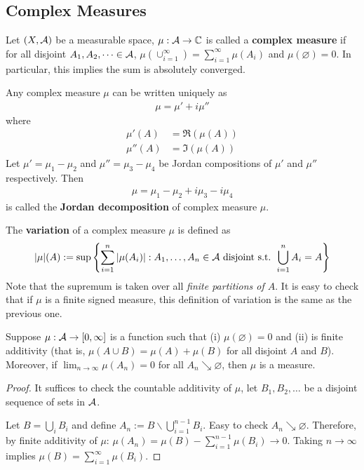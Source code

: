 \documentclass[11pt]{article}
\begin{document}
	\subsection{Complex Measures}
	\begin{definition}
		Let $(X, \mathcal{{A}})$ be a measurable space, $\mu: \mathcal{{A}} \to \mathbb{C}$ is called a \textbf{complex measure} if for all disjoint $A_1, A_2, \dots \in \mathcal{{A}}$, $\mu(\cup_{i=1}^\infty) = \sum_{i=1}^\infty \mu(A_i)$ and $\mu(\varnothing) = 0$.
		In particular, this implies the sum is absolutely converged.
		
		Any complex measure $\mu$ can be written uniquely as
		\begin{align}
			\mu = \mu' + i \mu''
		\end{align}
		where
		\begin{align}
			\mu'(A) &= \Re(\mu(A)) \\
			\mu''(A) &= \Im(\mu(A))
		\end{align}
		Let $\mu' = \mu_1 - \mu_2$ and $\mu'' = \mu_3 - \mu_4$ be Jordan compositions of $\mu'$ and $\mu''$ respectively. Then
		\begin{align}
			\mu = \mu_1 - \mu_2 + i\mu_3 - i \mu_4
		\end{align}
		is called the \textbf{Jordan decomposition} of complex measure $\mu$.
	\end{definition}
	
	\begin{definition}
		The \textbf{variation} of a complex measure $\mu$ is defined as 
		\begin{align}
			|\mu|(A) := \sup \left\{
			\sum_{i=1}^n |\mu(A_i)| : A_1,\dots,A_n \in \mathcal{{A}} \text{{ disjoint s.t. }} \bigcup_{i=1}^n A_i = A
			\right\}
		\end{align}
		Note that the supremum is taken over all \emph{finite partitions of $A$}. It is easy to check that if $\mu$ is a finite signed measure, this definition of variation is the same as the previous one.
	\end{definition}
	
	\begin{lemma}
		Suppose $\mu: \mathcal{{A}} \to [0, \infty]$ is a function such that (i) $\mu(\varnothing) = 0$ and (ii) is finite additivity (that is, $\mu(A \cup B) = \mu(A) + \mu(B)$ for all disjoint $A$ and $B$). Moreover, if $\lim_{n \to \infty} \mu(A_n) = 0$ for all $A_n \searrow \varnothing$, then $\mu$ is a measure.
		
		\begin{proof}
			It suffices to check the countable additivity of $\mu$, let $B_1, B_2, \dots$ be a disjoint sequence of sets in $\mathcal{{A}}$.
			
			Let $B = \bigcup_i B_i$ and define $A_n := B \backslash \bigcup_{i=1}^{n-1}B_i$. Easy to check $A_n \searrow \varnothing$. Therefore, by finite additivity of $\mu$: $\mu(A_n) = \mu(B) - \sum_{i=1}^{n-1} \mu(B_i) \to 0$. Taking $n \to \infty$ implies $\mu(B) = \sum_{i=1}^\infty \mu(B_i)$.
		\end{proof}
	\end{lemma}
	
\end{document}
